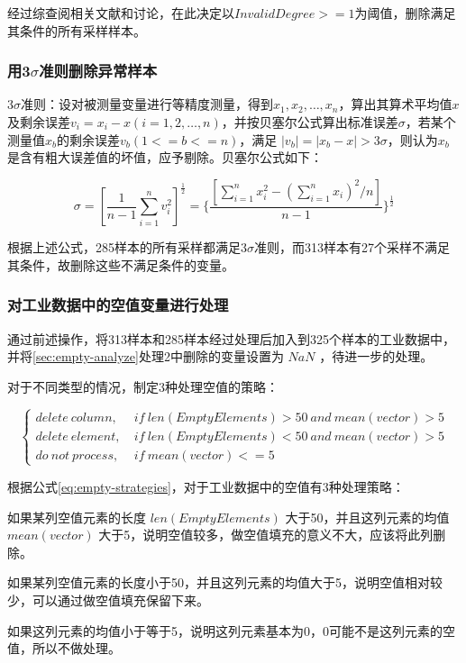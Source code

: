 \documentclass[bwprint]{gmcmthesis}
\begin{document}
经过综查阅相关文献和讨论，在此决定以$InvalidDegree >= 1$为阈值，删除满足其条件的所有采样样本。



\FloatBarrier
\subsubsection{用3$\sigma$准则删除异常样本}

3$\sigma$准则：设对被测量变量进行等精度测量，得到$x_1, x_2, \ldots, x_n$，算出其算术平均值$x$及剩余误差$v_i=x_i-x (i=1, 2, \ldots , n)$，并按贝塞尔公式算出标准误差$\sigma$，若某个测量值$x_b$的剩余误差$v_b ( 1 <= b <= n )$，满足 $|v_b| = | x_b - x | > 3\sigma$，则认为$x_b$是含有粗大误差值的坏值，应予剔除。贝塞尔公式如下：

\begin{equation}\label{eq:3sigma}
	\sigma = [\frac{1}{n-1}\sum_{i=1}^{n}v_i^2]^{\frac{1}{2}} = \{\frac{[\sum^n_{i=1}x_i^2 - (\sum^n_{i=1}x_i)^2/n]}{n-1}\}^{\frac{1}{2}}
\end{equation}

根据上述公式，285样本的所有采样都满足3$\sigma$准则，而313样本有27个采样不满足其条件，故删除这些不满足条件的变量。


\FloatBarrier
\subsubsection{对工业数据中的空值变量进行处理}\label{sec:process-all-nan}

通过前述操作，将313样本和285样本经过处理后加入到325个样本的工业数据中，并将\ref{sec:empty-analyze}处理2中删除的变量设置为 $NaN$ ，待进一步的处理。

对于不同类型的情况，制定3种处理空值的策略：

\begin{equation}\label{eq:empty-strategies}
\left\{
\begin{aligned}
delete \ column, \ & if \ len(EmptyElements)>50 \ and \ mean(vector)>5 \\  
delete \ element, \ & if \ len(EmptyElements)<50 \ and \ mean(vector)>5\\  
do \ not \ process, \ & if \ mean(vector)<=5
\end{aligned}
\right.
\end{equation}

根据公式\eqref{eq:empty-strategies}，对于工业数据中的空值有3种处理策略：

\begin{list}{策略\themylist}{}
	\item 如果某列空值元素的长度 $len(EmptyElements)$ 大于50，并且这列元素的均值 $ mean(vector)$ 大于5，说明空值较多，做空值填充的意义不大，应该将此列删除。
	\item 如果某列空值元素的长度小于50，并且这列元素的均值大于5，说明空值相对较少，可以通过做空值填充保留下来。
	\item 如果这列元素的均值小于等于5，说明这列元素基本为0，0可能不是这列元素的空值，所以不做处理。
\end{list}
\end{document}
